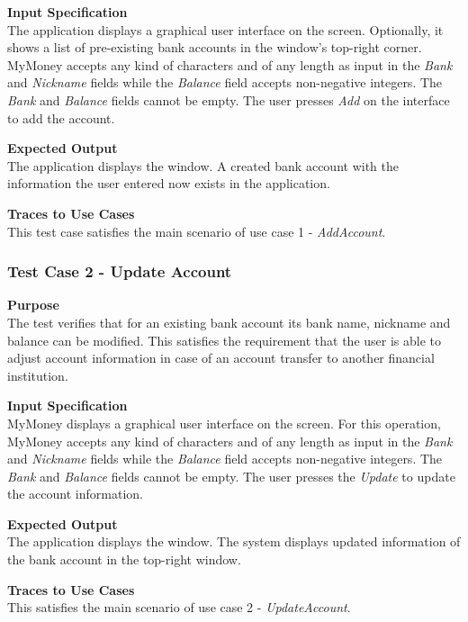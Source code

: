 \documentclass[12pt]{article}
\begin{document}
\noindent
    {\bf Input Specification}\\
    The application displays a graphical user interface on the screen.
    Optionally, it shows a list of pre-existing bank accounts in the window's top-right corner.
    MyMoney accepts any kind of characters and of any length as input in the \textit{Bank} and \textit{Nickname} fields while
    the \textit{Balance} field accepts non-negative integers. The \textit{Bank} and \textit{Balance} fields cannot be empty.
    The user presses \textit{Add} on the interface to add the account.
    
\noindent
    {\bf Expected Output}\\
    The application displays the window.
    A created bank account with the information the user entered now exists in the application.
    
\noindent
    {\bf Traces to Use Cases}\\
    This test case satisfies the main scenario of use case 1 - \textit{AddAccount}.


\subsubsection{Test Case 2 - Update Account} \label{TC-2}
\noindent
{\bf Purpose}\\
        The test verifies that for an existing bank account its bank name, nickname and balance can be modified.
        This satisfies the requirement that the user is able to adjust account information in case of an account transfer
        to another financial institution. 

\noindent
{\bf Input Specification}\\
            MyMoney displays a graphical user interface on the screen.
            For this operation, MyMoney accepts any kind of characters and of any length as
            input in the \textit{Bank} and \textit{Nickname} fields while the \textit{Balance} field accepts non-negative integers.
            The \textit{Bank} and \textit{Balance} fields cannot be empty. The user presses the \textit{Update} to update the account information.
            
\noindent
{\bf Expected Output}\\
    The application displays the window.    
    The system displays updated information of the bank account in the top-right window.

 \noindent
 {\bf Traces to Use Cases}\\
     This satisfies the main scenario of use case 2 - \textit{UpdateAccount}.
                 
\end{document}
